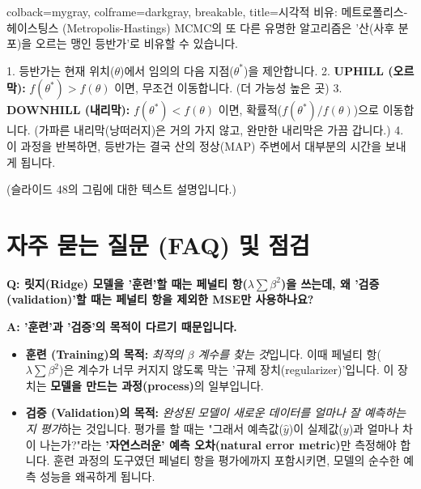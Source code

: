 \documentclass[11pt,a4paper]{book}
\theoremstyle{definition}
\begin{document}
\begin{tcolorbox}{colback=mygray, colframe=darkgray, breakable, title=시각적 비유: 메트로폴리스-헤이스팅스 (Metropolis-Hastings)}
    MCMC의 또 다른 유명한 알고리즘은 '산(사후 분포)을 오르는 맹인 등반가'로 비유할 수 있습니다.
    
    1.  등반가는 현재 위치($\theta$)에서 임의의 다음 지점($\theta^*$)을 제안합니다.
    2.  \textbf{UPHILL (오르막):} $f(\theta^*) > f(\theta)$ 이면, 무조건 이동합니다. (더 가능성 높은 곳)
    3.  \textbf{DOWNHILL (내리막):} $f(\theta^*) < f(\theta)$ 이면, 확률적($f(\theta^*) / f(\theta)$)으로 이동합니다.
        (가파른 내리막(낭떠러지)은 거의 가지 않고, 완만한 내리막은 가끔 갑니다.)
    4.  이 과정을 반복하면, 등반가는 결국 산의 정상(MAP) 주변에서 대부분의 시간을 보내게 됩니다.
    
    (슬라이드 48의 그림에 대한 텍스트 설명입니다.)
\end{tcolorbox}


\section{자주 묻는 질문 (FAQ) 및 점검}

\begin{warningbox}
    \textbf{Q: 릿지(Ridge) 모델을 '훈련'할 때는 페널티 항($\lambda \sum \beta^2$)을 쓰는데, 왜 '검증(validation)'할 때는 페널티 항을 제외한 MSE만 사용하나요?}
    
    \textbf{A: '훈련'과 '검증'의 목적이 다르기 때문입니다.}
    
    \begin{itemize}
        \item \textbf{훈련 (Training)의 목적:} \textit{최적의 $\beta$ 계수를 찾는 것}입니다.
        이때 페널티 항($\lambda \sum \beta^2$)은 계수가 너무 커지지 않도록 막는 '규제 장치(regularizer)'입니다.
        이 장치는 \textbf{모델을 만드는 과정(process)}의 일부입니다.
        
        \item \textbf{검증 (Validation)의 목적:} \textit{완성된 모델이 새로운 데이터를 얼마나 잘 예측하는지 평가}하는 것입니다.
        평가를 할 때는 "그래서 예측값($\hat{y}$)이 실제값($y$)과 얼마나 차이 나는가?"라는 \textbf{'자연스러운' 예측 오차(natural error metric)}만 측정해야 합니다.
        훈련 과정의 도구였던 페널티 항을 평가에까지 포함시키면, 모델의 순수한 예측 성능을 왜곡하게 됩니다.
    \end{itemize}
\end{warningbox}
\end{document}
